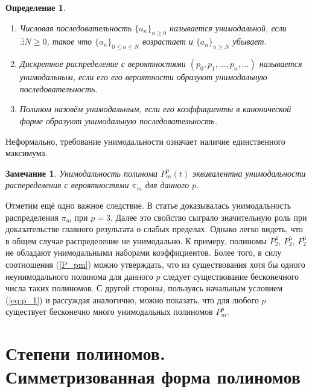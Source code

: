 \documentclass[14pt, a4paper, russian]{report}
\newtheorem{remark}{\indent Замечание}
\newtheorem{definition}{\indent Определение}
\begin{document}
\begin{definition} \nobreakspace\\
\begin{enumerate}
\item Числовая последовательность $\{a_n\}_{n \ge 0}$ называется унимодальной, если $\exists N \ge 0$, такое что $\{a_n\}_{0 \le n \le N}$ возрастает и $\{a_n\}_{n \ge N}$ убывает.
\item Дискретное распределение с вероятностями $(p_0,p_1,\ldots,p_n,\ldots)$ называется унимодальным, если его его вероятности образуют унимодальную последовательность.
\item Полином назовём унимодальным, если его коэффициенты в канонической форме образуют унимодальную последовательность.
\end{enumerate}
\end{definition}
Неформально, требование унимодальности означает наличие единственного максимума.
\begin{remark}
Унимодальность полинома $P_m^p(t)$ эквивалентна унимодальности распеределения с вероятностями $\pi_m$ для данного $p$.
\end{remark}

Отметим ещё одно важное следствие. В статье \cite{weaklimits} доказывалась унимодальность распределения $\pi_m$ при $p=3$. Далее это свойство сыграло значительную роль при доказательстве главного результата о слабых пределах. Однако легко видеть, что в общем случае распределение не унимодально. К примеру, полиномы $P_2^4$, $P_2^5$, $P_2^6$ не обладают унимодальными наборами коэффициентов. Более того, в силу соотношения (\ref{P_pm}) можно утверждать, что из существования хотя бы одного неунимодального полинома для данного $p$ следует существование бесконечного числа таких полиномов. С другой стороны, пользуясь начальным условием (\ref{eq:p_1}) и рассуждая аналогично, можно показать, что для любого $p$ существует бесконечно много унимодальных полиномов $P_m^p$.

\chapter{Степени полиномов. Симметризованная форма полиномов}
\end{document}
